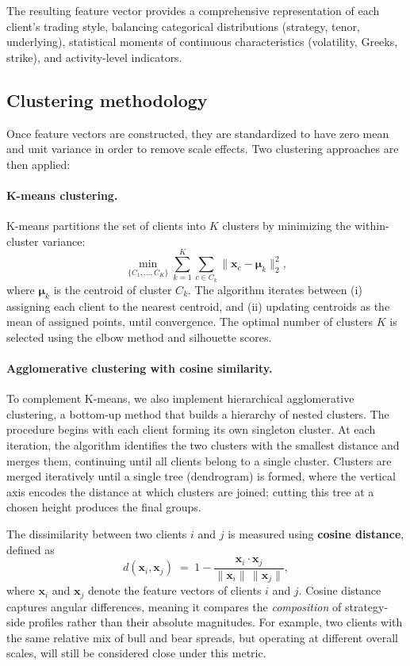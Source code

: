 \documentclass[12pt,a4paper]{report}
\begin{document}
The resulting feature vector provides a comprehensive representation of each client’s trading style, balancing categorical distributions (strategy, tenor, underlying), statistical moments of continuous characteristics (volatility, Greeks, strike), and activity-level indicators.


\subsection{Clustering methodology}

Once feature vectors are constructed, they are standardized to have zero mean and unit variance in order to remove scale effects. Two clustering approaches are then applied:

\paragraph{K-means clustering.}
K-means partitions the set of clients into \(K\) clusters by minimizing the within-cluster variance:
\[
    \min_{\{C_1, \dots, C_K\}} \sum_{k=1}^K \sum_{c \in C_k} \lVert \mathbf{x}_c - \boldsymbol{\mu}_k \rVert_2^2,
\]
where \(\boldsymbol{\mu}_k\) is the centroid of cluster \(C_k\). The algorithm iterates between (i) assigning each client to the nearest centroid, and (ii) updating centroids as the mean of assigned points, until convergence. The optimal number of clusters \(K\) is selected using the elbow method and silhouette scores.

\paragraph{Agglomerative clustering with cosine similarity.}  
To complement K-means, we also implement hierarchical agglomerative clustering, a bottom-up method that builds a hierarchy of nested clusters. The procedure begins with each client forming its own singleton cluster. At each iteration, the algorithm identifies the two clusters with the smallest distance and merges them, continuing until all clients belong to a single cluster. Clusters are merged iteratively until a single tree (dendrogram) is formed, where the vertical axis encodes the distance at which clusters are joined; cutting this tree at a chosen height produces the final groups.


The dissimilarity between two clients $i$ and $j$ is measured using \textbf{cosine distance}, defined as  
\[
    d(\mathbf{x}_i, \mathbf{x}_j) \;=\; 1 - \frac{\mathbf{x}_i \cdot \mathbf{x}_j}{\lVert \mathbf{x}_i \rVert \, \lVert \mathbf{x}_j \rVert},
\]  
where $\mathbf{x}_i$ and $\mathbf{x}_j$ denote the feature vectors of clients $i$ and $j$. Cosine distance captures angular differences, meaning it compares the \emph{composition} of strategy-side profiles rather than their absolute magnitudes. For example, two clients with the same relative mix of bull and bear spreads, but operating at different overall scales, will still be considered close under this metric.
\end{document}

